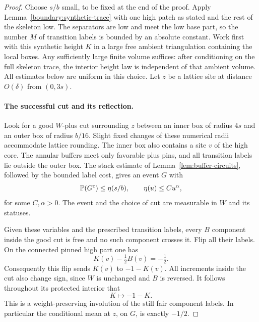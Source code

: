 \begin{proof}
Choose $s/b$ small, to be fixed at the end of the proof.  Apply
Lemma~\ref{boundary:synthetic-trace} with one high patch as stated and
the rest of the skeleton low.  The separators are low and meet the
low base part, so the number $M$ of transition labels is bounded by
an absolute constant.  Work first with this synthetic height $K$ in
a large free ambient triangulation containing the local boxes.  Any
sufficiently large finite volume suffices: after conditioning on the
full skeleton trace, the interior height law is independent of that
ambient volume.  All estimates below are uniform in this choice.
Let $z$ be a lattice site at distance $O(\delta)$ from $(0,3s)$.

\paragraph{The successful cut and its reflection.}
Look for a good $W$-plus cut surrounding $z$ between an inner box of
radius $4s$ and an outer box of radius $b/16$.  Slight fixed changes
of these numerical radii accommodate lattice rounding.  The inner
box also contains a site $v$ of the high core.  The annular buffers
meet only favorable plus pins, and all transition labels lie outside
the outer box.  The stack estimate of
Lemma~\ref{lem:buffer-circuits}, followed by the bounded label cost,
gives an event $G$ with
\begin{equation}
 \mathbb P(G^c)\le \eta(s/b),\qquad
 \eta(u)\le C u^{\alpha},
 \label{boundary:cut-failure}
\end{equation}
for some $C,\alpha>0$.  The event and the choice of cut are measurable
in $W$ and its statuses.

Given these variables and the prescribed transition labels, every
$B$ component inside the good cut is free and no such component
crosses it.  Flip all their labels.  On the connected pinned high
part one has
\[
 K(v)-\tfrac12B(v)=-\tfrac12.
\]
Consequently this flip sends $K(v)$ to $-1-K(v)$.  All increments
inside the cut also change sign, since $W$ is unchanged and $B$ is
reversed.  It follows throughout its protected interior that
\begin{equation}
 K\longmapsto-1-K.
 \label{boundary:minus-half-reflection}
\end{equation}
This is a weight-preserving involution of the still fair component
labels.  In particular the conditional mean at $z$, on $G$, is
exactly $-1/2$.


\end{proof}
